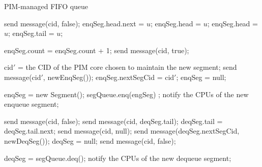 \begin{algorithm*}[ht!]
{\footnotesize
\caption{PIM-managed FIFO queue}
\label{alg:queue}
\vspace{-2.5ex}
\begin{multicols}{2}
\begin{algorithmic}[1]
        \State send message(cid, false);
    \Else
            \State enqSeg.head.next = $u$;
            \State enqSeg.head = $u$;
        \Else
            \State enqSeg.head = $u$;
            \State enqSeg.tail = $u$;
        \EndIf

        \State enqSeg.count = enqSeg.count + 1;
        \State send message(cid, true);

            \State cid$'$ = the CID of the PIM core chosen to maintain the new segment;
            \State send message(cid$'$, newEnqSeg());
            \State enqSeg.nextSegCid = cid$'$;
            \State enqSeg = null;
        \EndIf
    \EndIf
\item[]
\EndProcedure
\end{algorithmic}

\begin{algorithmic}[1]
	\State enqSeg = new Segment();
	\State segQueue.enq(engSeg) ;
	\State notify the CPUs of the new enqueue segment;
\EndProcedure
\end{algorithmic}

\columnbreak

\begin{algorithmic}[1]
        \State send message(cid, false);
    \Else
			\State send message(cid, deqSeg.tail);
            \State deqSeg.tail = deqSeg.tail.next;   
        \Else
				\State send message(cid, null);
			\Else
                \State send message(deqSeg.nextSegCid, newDeqSeg());
                \State deqSeg = null;
                \State send message(cid, false);
            \EndIf            
        \EndIf 
    \EndIf     
\item[]
\EndProcedure
\end{algorithmic}


\begin{algorithmic}[1]
	\State deqSeg = segQueue.deq();
	\State notify the CPUs of the new dequeue segment; 
\EndProcedure
\end{algorithmic}

\end{multicols}
}
\vspace{-2ex}
\end{algorithm*}


